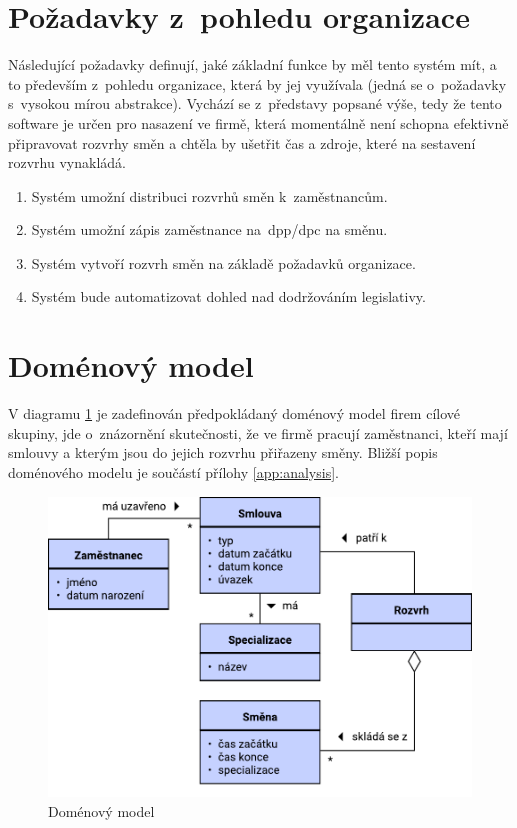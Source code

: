 \documentclass[twoside]{ctuthesis}
\begin{document}
\section{Požadavky z~pohledu organizace}

Následující požadavky definují, jaké základní funkce by měl tento systém mít, a to především z~pohledu organizace, která by jej využívala (jedná se o~požadavky s~vysokou mírou abstrakce). Vychází se z~představy popsané výše, tedy že tento software je určen pro nasazení ve firmě, která momentálně není schopna efektivně připravovat rozvrhy směn a chtěla by ušetřit čas a zdroje, které na sestavení rozvrhu vynakládá.

\begin{enumerate}[label=\textbf{B\arabic*.}]
	\item Systém umožní distribuci rozvrhů směn k~zaměstnancům.
	\item Systém umožní zápis zaměstnance na~\acrshort{dpp}/\acrshort{dpc} na směnu.
	\item Systém vytvoří rozvrh směn na základě požadavků organizace.
	\item Systém bude automatizovat dohled nad dodržováním legislativy.
\end{enumerate}

\section{Doménový model}

V diagramu \ref{fig:domainmodel} je zadefinován předpokládaný doménový model firem cílové skupiny, jde o~znázornění skutečnosti, že ve firmě pracují zaměstnanci, kteří mají smlouvy a kterým jsou do jejich rozvrhu přiřazeny směny. Bližší popis doménového modelu je součástí přílohy \ref{app:analysis}.

\begin{figure}[h]
	\includegraphics[scale=0.7]{img/domain-model.pdf}
	\caption{Doménový model}
	\label{fig:domainmodel}
\end{figure}
\end{document}

